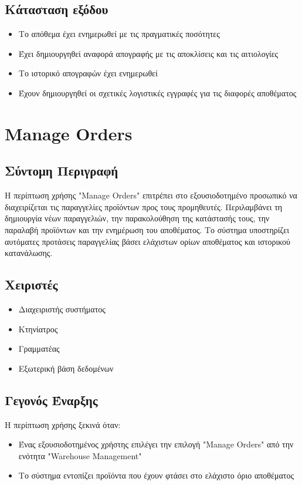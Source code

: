 \documentclass[12pt,a4paper,twoside]{book}
\begin{document}
\subsection{Κάτασταση εξόδου} %
\begin{itemize}
  \item Το απόθεμα έχει ενημερωθεί με τις πραγματικές ποσότητες
  \item Έχει δημιουργηθεί αναφορά απογραφής με τις αποκλίσεις και τις αιτιολογίες %
  \item Το ιστορικό απογραφών έχει ενημερωθεί
  \item Έχουν δημιουργηθεί οι σχετικές λογιστικές εγγραφές για τις διαφορές αποθέματος %
\end{itemize}

\section{Manage Orders}

\subsection{Σύντομη Περιγραφή}
Η περίπτωση χρήσης "Manage Orders" επιτρέπει στο εξουσιοδοτημένο προσωπικό να διαχειρίζεται τις παραγγελίες προϊόντων προς τους προμηθευτές. Περιλαμβάνει τη δημιουργία νέων παραγγελιών, την παρακολούθηση της κατάστασής τους, την παραλαβή προϊόντων και την ενημέρωση του αποθέματος. Το σύστημα υποστηρίζει αυτόματες προτάσεις παραγγελίας βάσει ελάχιστων ορίων αποθέματος και ιστορικού κατανάλωσης. %

\subsection{Χειριστές}
\begin{itemize}
  \item Διαχειριστής συστήματος
  \item Κτηνίατρος
  \item Γραμματέας
  \item Εξωτερική βάση δεδομένων %
\end{itemize}

\subsection{Γεγονός Έναρξης}
Η περίπτωση χρήσης ξεκινά όταν:
\begin{itemize}
  \item Ένας εξουσιοδοτημένος χρήστης επιλέγει την επιλογή "Manage Orders" από την ενότητα "Warehouse Management" %
  \item Το σύστημα εντοπίζει προϊόντα που έχουν φτάσει στο ελάχιστο όριο αποθέματος
\end{itemize}
\end{document}
